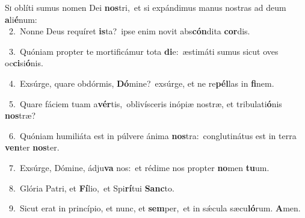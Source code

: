 \lettrine{\initial\textcolor{\initialcolor}{S}}{i} oblíti sumus nomen Dei \textbf{nos}\-tri,~\star et si expándimus manus nostras ad deum \textbf{a}\-li\-\textbf{é}\-num:\\
{\numbfont\textcolor{\numbcolor}{~2.}}~Nonne Deus requíret \textbf{is}\-ta?~\star ipse enim novit abs\-\textbf{cón}\-dita \textbf{cor}\-dis.\par
{\numbfont\textcolor{\numbcolor}{~3.}}~Quóniam propter te mortificámur tota \textbf{di}\-e:~\star æstimáti sumus sicut oves oc\-\textbf{ci}\-si\-\textbf{ó}\-nis.\par
{\numbfont\textcolor{\numbcolor}{~4.}}~Exsúrge, quare obdórmis, \textbf{Dó}\-mine?~\star exsúrge, et ne re\-\textbf{pél}\-las in \textbf{fi}\-nem.\par
{\numbfont\textcolor{\numbcolor}{~5.}}~Quare fáciem tuam a\-\textbf{vér}\-tis,~\star oblivísceris inópiæ nostræ, et tribulati\-\textbf{ó}\-nis \textbf{nos}\-træ?\par
{\numbfont\textcolor{\numbcolor}{~6.}}~Quóniam humiliáta est in púlvere ánima \textbf{nos}\-tra:~\star conglutinátus est in terra \textbf{ven}\-ter \textbf{nos}\-ter.\par
{\numbfont\textcolor{\numbcolor}{~7.}}~Exsúrge, Dómine, ádju\textbf{va} nos:~\star et rédime nos propter \textbf{no}\-men \textbf{tu}\-um.\par
{\numbfont\textcolor{\numbcolor}{~8.}}~Glória Patri, et \textbf{Fí}\-lio,~\star et Spi\-\textbf{rí}\-tui \textbf{Sanc}\-to.\par
{\numbfont\textcolor{\numbcolor}{~9.}}~Sicut erat in princípio, et nunc, et \textbf{sem}\-per,~\star et in sǽcula sæcu\-\textbf{ló}\-rum. \textbf{A}\-men.\par
